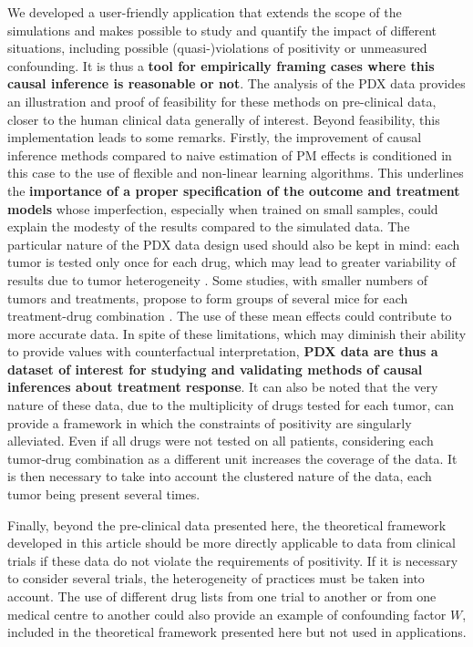 \documentclass[a4paper,12pt,twoside,onecolumn,openright,final,oldfontcommands]{memoir}
\begin{document}
We developed a user-friendly application that extends the scope of the
simulations and makes possible to study and quantify the impact of
different situations, including possible (quasi-)violations of
positivity or unmeasured confounding. It is thus a \textbf{tool for
empirically framing cases where this causal inference is reasonable or
not}. The analysis of the PDX data provides an illustration and proof of
feasibility for these methods on pre-clinical data, closer to the human
clinical data generally of interest. Beyond feasibility, this
implementation leads to some remarks. Firstly, the improvement of causal
inference methods compared to naive estimation of PM effects is
conditioned in this case to the use of flexible and non-linear learning
algorithms. This underlines the \textbf{importance of a proper
specification of the outcome and treatment models} whose imperfection,
especially when trained on small samples, could explain the modesty of
the results compared to the simulated data. The particular nature of the
PDX data design used should also be kept in mind: each tumor is tested
only once for each drug, which may lead to greater variability of
results due to tumor heterogeneity \citep{gao2015high}. Some studies,
with smaller numbers of tumors and treatments, propose to form groups of
several mice for each treatment-drug combination
\citep{hidalgo2014patient}. The use of these mean effects could
contribute to more accurate data. In spite of these limitations, which
may diminish their ability to provide values with counterfactual
interpretation, \textbf{PDX data are thus a dataset of interest for
studying and validating methods of causal inferences about treatment
response}. It can also be noted that the very nature of these data, due
to the multiplicity of drugs tested for each tumor, can provide a
framework in which the constraints of positivity are singularly
alleviated. Even if all drugs were not tested on all patients,
considering each tumor-drug combination as a different unit increases
the coverage of the data. It is then necessary to take into account the
clustered nature of the data, each tumor being present several times.

Finally, beyond the pre-clinical data presented here, the theoretical
framework developed in this article should be more directly applicable
to data from clinical trials if these data do not violate the
requirements of positivity. If it is necessary to consider several
trials, the heterogeneity of practices must be taken into account. The
use of different drug lists from one trial to another or from one
medical centre to another could also provide an example of confounding
factor \(W\), included in the theoretical framework presented here but
not used in applications.
\end{document}
